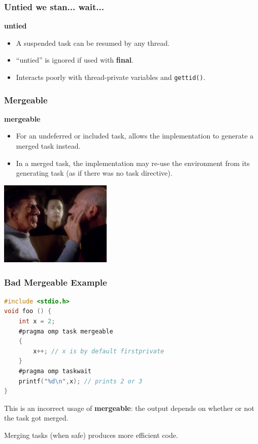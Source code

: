 \begin{frame}
\frametitle{Untied we stan... wait...}

\begin{center}
  {\bf untied}
\end{center}
  \begin{itemize}
    \item A suspended task can be resumed by any thread.
    \item ``untied'' is ignored if used with {\bf final}.
    \item Interacts poorly with thread-private variables and {\tt gettid()}.
  \end{itemize}


\end{frame}



\begin{frame}
\frametitle{Mergeable}

\begin{center}
  {\bf mergeable}
\end{center}

  \begin{itemize}
    \item For an undeferred or included task,
    allows the implementation to generate a merged task instead.
    \item In a merged task, the implementation may re-use the environment from its generating task (as if there was no task directive).
  \end{itemize}

\begin{center}
	\includegraphics[width=0.4\textwidth]{images/mindmeld.jpg}
\end{center}

\end{frame}


\begin{frame}[fragile]
\frametitle{Bad Mergeable Example}

  \begin{lstlisting}[language=C]
#include <stdio.h>
void foo () {
    int x = 2;
    #pragma omp task mergeable
    {
        x++; // x is by default firstprivate
    }
    #pragma omp taskwait
    printf("%d\n",x); // prints 2 or 3
}
  \end{lstlisting}
  
    This is an incorrect usage of {\bf mergeable}: the output depends
      on whether or not the task got merged.
  
  
    Merging tasks (when safe) produces more efficient code.
\end{frame}


